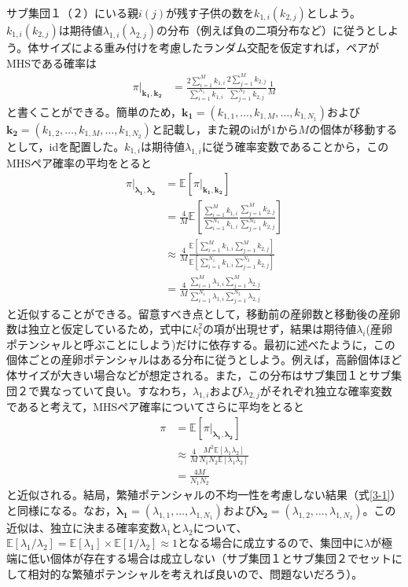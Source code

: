 \documentclass[12pt, English]{article}
\begin{document}
\begin{spacing}{1.9}
サブ集団１（２）にいる親$i(j)$が残す子供の数を$k_{1,i}(k_{2,j})$としよう。$k_{1,i}(k_{2,j})$は期待値$\lambda_{1,i}(\lambda_{2,j})$の分布（例えば負の二項分布など）に従うとしよう。体サイズによる重み付けを考慮したランダム交配を仮定すれば，ペアがMHSである確率は
\begin{align}
\pi | _{\boldsymbol{k_1, k_2}} &= \frac{ 2\sum_{i=1}^M k_{1,i} } { \sum_{i=1}^{N_1} k_{1,i} } \frac{ 2\sum_{j=1}^M k_{2,j} } { \sum_{j=1}^{N_2} k_{2,j} } \frac{1}{M} 
\end{align}
と書くことができる。簡単のため，$\boldsymbol{k_1}=(k_{1,1}, \ldots, k_{1,M}, \ldots, k_{1,N_1})$および$\boldsymbol{k_2}=(k_{1,2}, \ldots, k_{1,M}, \ldots, k_{1,N_2})$と記載し，また親のidが$1$から$M$の個体が移動するとして，idを配置した。$k_{1,i}$は期待値$\lambda_{1,i}$に従う確率変数であることから，このMHSペア確率の平均をとると
\begin{align}
\pi | _{\boldsymbol{\lambda_1, \lambda_2}} &= \mathbb{E}[\pi | _{\boldsymbol{k_1, k_2}}] \nonumber\\
&= \frac{4}{M} \mathbb{E}\left[\frac{ \sum_{i=1}^M k_{1,i} } { \sum_{i=1}^{N_1} k_{1,i} } \frac{ \sum_{j=1}^M k_{2,j} } { \sum_{j=1}^{N_2} k_{2,j} } \right]   \nonumber\\
&\approx \frac{4}{M} \frac{ \mathbb{E}\left[ \sum_{i=1}^M k_{1,i} \sum_{j=1}^M k_{2,j} \right] } {\mathbb{E}\left[ \sum_{i=1}^{N_1} k_{1,i} \sum_{j=1}^{N_2} k_{2,j}\right]} \nonumber\\
&= \frac{4}{M} \frac{ \sum_{i=1}^M \lambda_{1,i} \sum_{j=1}^M \lambda_{2,j} } {\sum_{i=1}^{N_1} \lambda_{1,i} \sum_{j=1}^{N_2} \lambda_{2,j}} 
\end{align}
と近似することができる。留意すべき点として，移動前の産卵数と移動後の産卵数は独立と仮定しているため，式中に$k_i^2$の項が出現せず，結果は期待値$\lambda_i$(産卵ポテンシャルと呼ぶことにしよう)だけに依存する。最初に述べたように，この個体ごとの産卵ポテンシャルはある分布に従うとしよう。例えば，高齢個体ほど体サイズが大きい場合などが想定される。また，この分布はサブ集団１とサブ集団２で異なっていて良い。すなわち，$\lambda_{1,i}$および$\lambda_{2,j}$がそれぞれ独立な確率変数であると考えて，MHSペア確率についてさらに平均をとると
\begin{align}
\pi &= \mathbb{E}[\pi | _{\boldsymbol{\lambda_1, \lambda_2}}] \nonumber\\ 
&\approx \frac{4}{M} \frac{M^2 \mathbb{E}[\lambda_1 \lambda_2]}{N_1 N_2 \mathbb{E}[\lambda_1 \lambda_2]}\nonumber\\
&= \frac{4M}{N_{1}N_{2}}
\label{4-1}
\end{align}
と近似される。結局，繁殖ポテンシャルの不均一性を考慮しない結果（式\ref{3-1}）と同様になる。なお，$\boldsymbol{\lambda_1}=(\lambda_{1,1}, \ldots, \lambda_{1,N_1})$および$\boldsymbol{\lambda_2}=(\lambda_{1,2}, \ldots, \lambda_{1,N_2})$。この近似は、独立に決まる確率変数$\lambda_1$と$\lambda_2$について、$\mathbb{E}[\lambda_1/\lambda_2]=\mathbb{E}[\lambda_1] \times \mathbb{E}[1/\lambda_2] \approx 1$となる場合に成立するので、集団中に$\lambda$が極端に低い個体が存在する場合は成立しない（サブ集団１とサブ集団２でセットにして相対的な繁殖ポテンシャルを考えれば良いので、問題ないだろう）。




\end{spacing}
\end{document}
